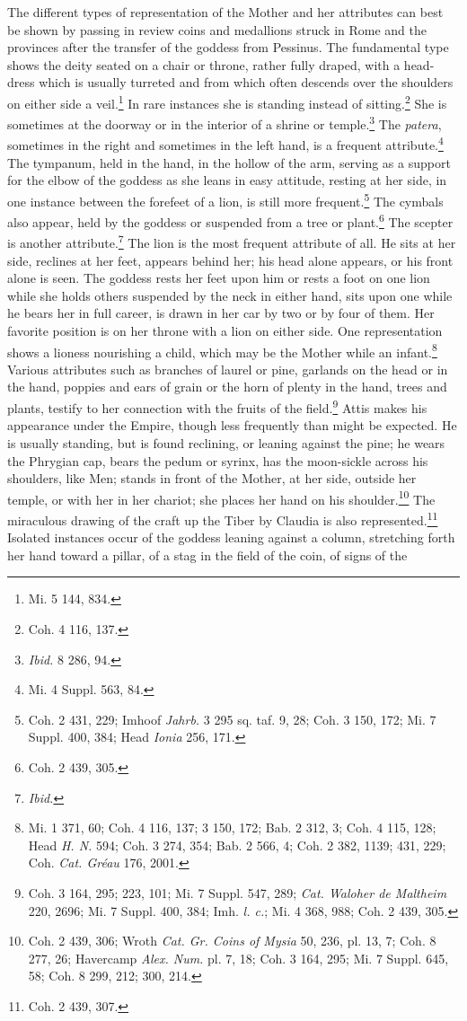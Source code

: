 \documentclass[a4paper, 11pt, oneside, polutonikogreek, french]{article}
\begin{document}
The different types of representation of the Mother and her attributes can best be shown by passing in review coins and medallions struck in Rome and the provinces after the transfer of the goddess from Pessinus. The fundamental type shows the deity seated on a chair or throne, rather fully draped, with a head-dress which is usually turreted and from which often descends over the shoulders on either side a veil.\footnote{Mi. 5 144, 834.} In rare instances she is standing instead of sitting.\footnote{Coh. 4 116, 137.} She is sometimes at the doorway or in the interior of a shrine or temple.\footnote{\emph{Ibid.} 8 286, 94.} The \emph{patera}, sometimes in the right and sometimes in the left hand, is a frequent attribute.\footnote{Mi. 4 Suppl. 563, 84.} The tympanum, held in the hand, in the hollow of the arm, serving as a support for the elbow of the goddess as she leans in easy attitude, resting at her side, in one instance between the forefeet of a lion, is still more frequent.\footnote{Coh. 2 431, 229; Imhoof \emph{Jahrb.} 3 295 sq. taf. 9, 28; Coh. 3 150, 172; Mi. 7 Suppl. 400, 384; Head \emph{Ionia} 256, 171.} The cymbals also appear, held by the goddess or suspended from a tree or plant.\footnote{Coh. 2 439, 305.} The scepter is another attribute.\footnote{\emph{Ibid.}} The lion is the most frequent attribute of all. He sits at her side, reclines at her feet, appears behind her; his head alone appears, or his front alone is seen. The goddess rests her feet upon him or rests a foot on one lion while she holds others suspended by the neck in either hand, sits upon one while he bears her in full career, is drawn in her car by two or by four of them. Her favorite position is on her throne with a lion on either side. One representation shows a lioness nourishing a child, which may be the Mother while an infant.\footnote{Mi. 1 371, 60; Coh. 4 116, 137; 3 150, 172; Bab. 2 312, 3; Coh. 4 115, 128; Head \emph{H. N.} 594; Coh. 3 274, 354; Bab. 2 566, 4; Coh. 2 382, 1139; 431, 229; Coh. \emph{Cat. Gréau} 176, 2001.} Various attributes such as branches of laurel or pine, garlands on the head or in the hand, poppies and ears of grain or the horn of plenty in the hand, trees and plants, testify to her connection with the fruits of the field.\footnote{Coh. 3 164, 295; 223, 101; Mi. 7 Suppl. 547, 289; \emph{Cat. Waloher de Maltheim} 220, 2696; Mi. 7 Suppl. 400, 384; Imh. \emph{l. c.}; Mi. 4 368, 988; Coh. 2 439, 305.} Attis makes his appearance under the Empire, though less frequently than might be expected. He is usually standing, but is found reclining, or leaning against the pine; he wears the Phrygian cap, bears the pedum or syrinx, has the moon-sickle across his shoulders, like Men; stands in front of the Mother, at her side, outside her temple, or with her in her chariot; she places her hand on his shoulder.\footnote{Coh. 2 439, 306; Wroth \emph{Cat. Gr. Coins of Mysia} 50, 236, pl. 13, 7; Coh. 8 277, 26; Havercamp \emph{Alex. Num.} pl. 7, 18; Coh. 3 164, 295; Mi. 7 Suppl. 645, 58; Coh. 8 299, 212; 300, 214.} The miraculous drawing of the craft up the Tiber by Claudia is also represented.\footnote{Coh. 2 439, 307.} Isolated instances occur of the goddess leaning against a column, stretching forth her hand toward a pillar, of a stag in the field of the coin, of signs of the 
\end{document}
